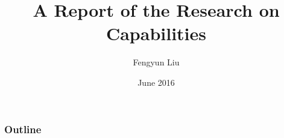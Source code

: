 \documentclass[aspectratio=169]{beamer}
\title{\LARGE{A Report of the Research on Capabilities}}
\author[Fengyun Liu]{\large{Fengyun Liu}}
\institute{EPFL}
\date{June 2016}
\begin{document}
{
\begin{frame}
  \titlepage
\end{frame}
}

\begin{frame}
\frametitle{Outline}
\tableofcontents
\end{frame}


\end{document}
